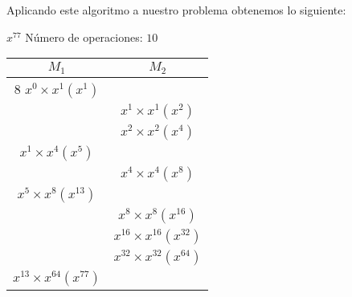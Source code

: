 \documentclass{article}
\begin{document}
Aplicando este algoritmo a nuestro problema obtenemos lo siguiente: 
\begin{center}
    $x^{77} $ Número de operaciones: $10$  \\
    \begin{tabular}{|c|c|}
         \hline
            $M_1$  & $M_2$ \\ \hline8
            $x^{0} \times x^{1} (x^{1})$& \\ \hline
            & $x^{1} \times x^{1} (x^{2})$ \\ \hline 
            & $x^{2} \times x^{2} (x^{4})$ \\ \hline 
            $x^{1} \times x^{4} (x^{5})$& \\ \hline
            & $x^{4} \times x^{4} (x^{8})$ \\ \hline 
            $x^{5} \times x^{8} (x^{13})$& \\ \hline
            & $x^{8} \times x^{8} (x^{16})$ \\ \hline 
            & $x^{16} \times x^{16} (x^{32})$ \\ \hline 
            & $x^{32} \times x^{32} (x^{64})$ \\ \hline 
            $x^{13} \times x^{64} (x^{77})$& \\ \hline
        \end{tabular}
        \end{center}
        \newpage
\end{document}
